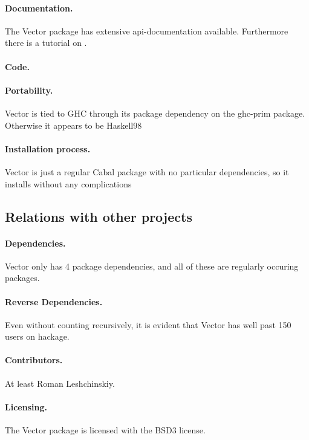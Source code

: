 \paragraph{Documentation.} The Vector package has extensive api-documentation
available. Furthermore there is a tutorial on
\cite{homepage:haskell:vectortutorial}.

\paragraph{Code.}

\paragraph{Portability.} Vector is tied to GHC through its package dependency
on the ghc-prim package. Otherwise it appears to be Haskell98 

\paragraph{Installation process.} Vector is just a regular Cabal package with
no particular dependencies, so it installs without any complications

\subsection{Relations with other projects}

\paragraph{Dependencies.} Vector only has 4 package dependencies, and all of
these are regularly occuring packages.

\paragraph{Reverse Dependencies.} Even without counting recursively, it is
evident that Vector has well past 150 users on hackage.

\paragraph{Contributors.}
At least Roman Leshchinskiy. 

\paragraph{Licensing.} The Vector package is licensed with the BSD3 license.


